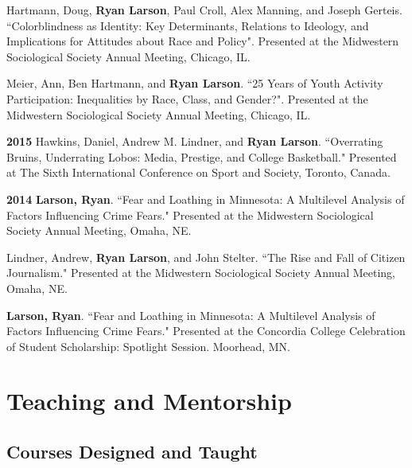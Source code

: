 \documentclass[letterpaper]{article}
\newenvironment{publist}{%
  \begin{list}{}{%
    \setlength{\leftmargin}{0cm}   %
    \setlength{\labelwidth}{2cm}     %
    \setlength{\labelsep}{0.5cm}     %
  }%
}{%
  \end{list}%
}
\begin{document}
\begin{publist}
\item Hartmann, Doug, \textbf{Ryan Larson}, Paul Croll, Alex Manning,  and Joseph Gerteis. ``Colorblindness as Identity:  Key Determinants, Relations to Ideology, and Implications for Attitudes about Race and Policy". Presented at the Midwestern Sociological Society Annual Meeting, Chicago, IL. 

\item Meier, Ann, Ben Hartmann, and \textbf{Ryan Larson}. ``25 Years of Youth Activity Participation: Inequalities by Race, Class, and Gender?". Presented at the Midwestern Sociological Society Annual Meeting, Chicago, IL. 

\item[\textbf{2015}] Hawkins, Daniel, Andrew M. Lindner, and \textbf{Ryan Larson}. ``Overrating Bruins, Underrating Lobos: Media, Prestige, and College Basketball." Presented at The Sixth International Conference on Sport and Society, Toronto, Canada.

\item[\textbf{2014}] \textbf{Larson, Ryan}. ``Fear and Loathing in Minnesota: A Multilevel Analysis of Factors Influencing Crime Fears." Presented at the Midwestern Sociological Society Annual Meeting, Omaha, NE.

\item Lindner, Andrew, \textbf{Ryan Larson}, and John Stelter. ``The Rise and Fall of Citizen Journalism." Presented at the Midwestern Sociological Society Annual Meeting, Omaha, NE. 

\item \textbf{Larson, Ryan}. ``Fear and Loathing in Minnesota: A Multilevel Analysis of Factors Influencing Crime Fears." Presented at the Concordia College Celebration of Student Scholarship: Spotlight Session. Moorhead, MN. 


\end{publist}


\section*{\textbf{Teaching and Mentorship}}

\subsection*{Courses Designed and Taught}
\end{document}
